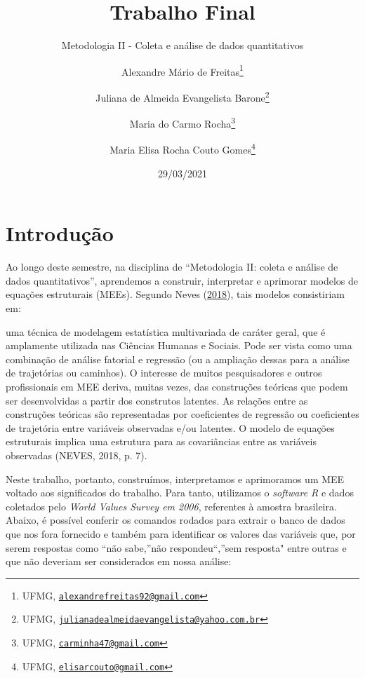 \documentclass[
  12pt,
]{article}
\title{Trabalho Final}
\subtitle{Metodologia II - Coleta e análise de dados quantitativos}
\author{Alexandre Mário de Freitas\footnote{UFMG,
  \href{mailto:alexandrefreitas92@gmail.com}{\nolinkurl{alexandrefreitas92@gmail.com}}} \and Juliana
de Almeida Evangelista Barone\footnote{UFMG,
  \href{mailto:julianadealmeidaevangelista@yahoo.com.br}{\nolinkurl{julianadealmeidaevangelista@yahoo.com.br}}} \and Maria
do Carmo Rocha\footnote{UFMG,
  \href{mailto:carminha47@gmail.com}{\nolinkurl{carminha47@gmail.com}}} \and Maria
Elisa Rocha Couto Gomes\footnote{UFMG,
  \href{mailto:elisarcouto@gmail.com}{\nolinkurl{elisarcouto@gmail.com}}}}
\date{29/03/2021}
\begin{document}
\maketitle

\hypertarget{introduuxe7uxe3o}{%
\section{Introdução}\label{introduuxe7uxe3o}}

Ao longo deste semestre, na disciplina de ``Metodologia II: coleta e
análise de dados quantitativos'', aprendemos a construir, interpretar e
aprimorar modelos de equações estruturais (MEEs). Segundo Neves
(\protect\hyperlink{ref-neves2018modelo}{2018}), tais modelos
consistiriam em:

\setlength{\parindent}{0cm}

\begin{quoting}[rightmargin=0cm,leftmargin=4cm]
\begin{singlespace}
{\footnotesize 
uma técnica de modelagem estatística multivariada de caráter geral, que é amplamente utilizada nas Ciências Humanas e Sociais. Pode ser vista como uma combinação de análise fatorial e regressão (ou a ampliação dessas para a análise de trajetórias ou caminhos). O interesse de muitos pesquisadores e outros profissionais em MEE deriva, muitas vezes, das construções teóricas que podem ser desenvolvidas a partir dos construtos latentes. As relações entre as construções teóricas são representadas por coeficientes de regressão ou coeficientes de trajetória entre variáveis observadas e/ou latentes. O modelo de equações estruturais implica uma estrutura para as covariâncias entre as variáveis observadas (NEVES, 2018, p. 7).
}
\end{singlespace}
\end{quoting}

\setlength{\parindent}{1.25cm}

Neste trabalho, portanto, construímos, interpretamos e aprimoramos um
MEE voltado aos significados do trabalho. Para tanto, utilizamos o
\emph{software R} e dados coletados pelo \emph{World Values Survey em
2006}, referentes à amostra brasileira. Abaixo, é possível conferir os
comandos rodados para extrair o banco de dados que nos fora fornecido e
também para identificar os valores das variáveis que, por serem
respostas como ``não sabe,''não respondeu``,''sem resposta" entre outras
e que não deveriam ser considerados em nossa análise:
\end{document}
